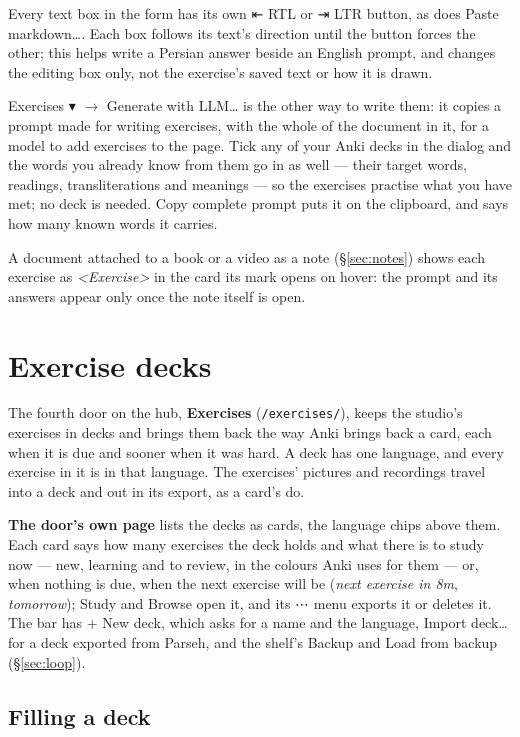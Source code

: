 \documentclass[11pt,oneside]{report}
\newcommand{\sym}[1]{{\symfont #1}}
\newcommand{\menu}[1]{\textsf{#1}}
\begin{document}
Every text box in the form has its own \menu{\sym{⇤} RTL} or \menu{\sym{⇥}
LTR} button, as does \menu{Paste markdown\ldots}. Each box follows its text's
direction until the button forces the other; this helps write a Persian
answer beside an English prompt, and changes the editing box only, not the
exercise's saved text or how it is drawn.

\menu{Exercises \sym{▾}} $\rightarrow$ \menu{Generate with LLM\ldots} is
the other way to write them: it copies a prompt made for writing exercises,
with the whole of the document in it, for a model to add exercises to the
page. Tick any of your Anki decks in the dialog and the words you already
know from them go in as well --- their target words, readings,
transliterations and meanings --- so the exercises practise what you have
met; no deck is needed. \menu{Copy complete prompt} puts it on the clipboard,
and says how many known words it carries.

A document attached to a book or a video as a note (\S\ref{sec:notes}) shows
each exercise as \emph{<Exercise>} in the card its mark opens on hover: the
prompt and its answers appear only once the note itself is open.

\section{Exercise decks}
\label{sec:decks}

The fourth door on the hub, \textbf{Exercises} (\texttt{/exercises/}), keeps
the studio's exercises in decks and brings them back the way Anki brings
back a card, each when it is due and sooner when it was hard. A deck has one
language, and every exercise in it is in that language. The exercises'
pictures and recordings travel into a deck and out in its export, as a
card's do.

\textbf{The door's own page} lists the decks as cards, the language chips
above them. Each card says how many exercises the deck holds and what there
is to study now --- new, learning and to review, in the colours Anki uses for
them --- or, when nothing is due, when the next exercise will be
(\emph{next exercise in 8m}, \emph{tomorrow}); \menu{Study} and
\menu{Browse} open it, and its \menu{\sym{⋯}} menu exports it or deletes it.
The bar has \menu{+ New deck}, which asks for a name and the language,
\menu{Import deck\ldots} for a deck exported from Parseh, and the shelf's
\menu{Backup} and \menu{Load from backup} (\S\ref{sec:loop}).

\subsection*{Filling a deck}
\end{document}
